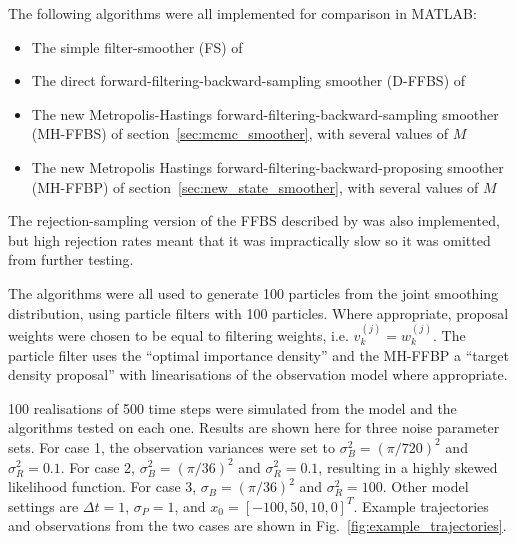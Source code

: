 \documentclass[10pt,twocolumn,twoside]{IEEEtran}
\begin{document}
The following algorithms were all implemented for comparison in MATLAB:

\begin{itemize}
	\item The simple filter-smoother (FS) of \cite{Kitagawa1996}
	\item The direct forward-filtering-backward-sampling smoother (D-FFBS) of \cite{Godsill2004}
	\item The new Metropolis-Hastings forward-filtering-backward-sampling smoother (MH-FFBS) of section~\ref{sec:mcmc_smoother}, with several values of $M$
	\item The new Metropolis Hastings forward-filtering-backward-proposing smoother (MH-FFBP) of section~\ref{sec:new_state_smoother}, with several values of $M$
\end{itemize}

The rejection-sampling version of the FFBS described by \cite{Douc2009} was also implemented, but high rejection rates meant that it was impractically slow so it was omitted from further testing.

The algorithms were all used to generate 100 particles from the joint smoothing distribution, using particle filters with 100 particles. Where appropriate, proposal weights were chosen to be equal to filtering weights, i.e. $v_k^{(j)} = w_k^{(j)}$. The particle filter uses the ``optimal importance density'' and the MH-FFBP a ``target density proposal'' with linearisations of the observation model where appropriate.

100 realisations of 500 time steps were simulated from the model and the algorithms tested on each one. Results are shown here for three noise parameter sets. For case 1, the observation variances were set to $\sigma_B^2 = (\pi/720)^2$ and $\sigma_R^2 = 0.1$. For case 2, $\sigma_B^2 = (\pi/36)^2$ and $\sigma_R^2 = 0.1$, resulting in a highly skewed likelihood function. For case 3, $\sigma_B = (\pi/36)^2$ and $\sigma_R^2 = 100$. Other model settings are $\Delta t = 1$, $\sigma_P = 1$, and $x_0 = [-100, 50, 10, 0]^T$. Example trajectories and observations from the two cases are shown in Fig.~\ref{fig:example_trajectories}.
\end{document}

